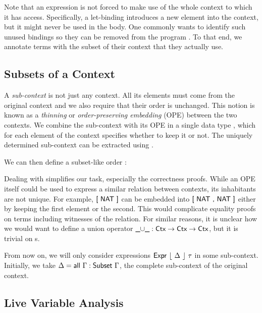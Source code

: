 \documentclass[11pt,a4paper]{article}
\newcommand{\Floor}[1]{\lfloor #1 \rfloor\xspace}
\newcommand{\AgdaFloor}[1]{\AgdaFunction{$\lfloor$}\ #1\ \AgdaFunction{$\rfloor$}}
\begin{document}
Note that an expression is not forced to make use of the whole context to which it has access.
Specifically, a let-binding introduces a new element into the context, but it might never be used
in the body.
One commonly wants to identify such unused bindings so they can be removed from the program
\cite[Live Variable Analysis]{nielsen1999analysis}.
To that end, we annotate terms with the subset of their context that they actually use.


\subsection{Subsets of a Context}

A \emph{sub-context} is not just any context.
All its elements must come from the original context and we also require that their order is unchanged.
This notion is known as a \emph{thinning} or \emph{order-preserving embedding} (OPE) \cite{chapman2009type}
between the two contexts.
We combine the sub-context with its OPE in a single data type ,
which for each element of the context specifies whether to keep it or not.
The uniquely determined sub-context can be extracted using \AgdaFunction{$\Floor{\_}$}.

\CodeSubsetSubset

We can then define a subset-like order \AgdaFunction{$\subseteq$}:

\CodeSubsetOpSubseteq

Dealing with  simplifies our task, especially the correctness proofs.
While an OPE itself could be used to express a similar relation between contexts,
its inhabitants are not unique.
For example, $\AgdaInductiveConstructor{[\ NAT\ ]}$
can be embedded into $\AgdaInductiveConstructor{[\ NAT\ ,\ NAT\ ]}$
either by keeping the first element or the second.
This would complicate equality proofs on terms including witnesses of the relation.
For similar reasons, it is unclear how we would want to define a union operator
$\AgdaFunction{$\_\cup\_$} : \AgdaDatatype{Ctx} \to \AgdaDatatype{Ctx} \to \AgdaDatatype{Ctx}$,
but it is trivial on s.

From now on, we will only consider expressions
$\AgdaDatatype{Expr}\ \AgdaFloor{\Delta}\ \tau$ in some sub-context.
Initially, we take $\Delta = \AgdaFunction{all}\ \Gamma : \AgdaDatatype{Subset}\ \Gamma$,
the complete sub-context of the original context.


\subsection{Live Variable Analysis}
\end{document}
